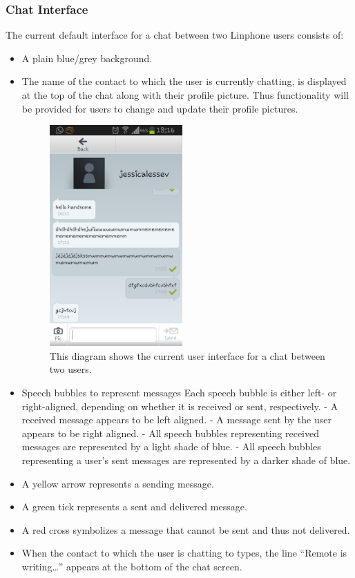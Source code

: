 \documentclass[11pt]{article}
\begin{document}
\subsubsection{Chat Interface}
The current default interface for a chat between two Linphone users consists of:
\begin{itemize}
\item	A plain blue/grey background.
\item	The name of the contact to which the user is currently chatting, is displayed at the top of the chat along with their profile picture.
\subitem Thus functionality will be provided for users to change and update their profile pictures.
\begin{figure}[H]
\centering
\includegraphics[width=2in]{./images/screen.png}
\caption[Sample Chat Screen]{This diagram shows the current user interface for a chat between two users.}
\label{cd-chat-interface}
\end{figure}
\item	Speech bubbles to represent messages
\subitem	Each speech bubble is either left- or right-aligned, depending on whether it is received or sent, respectively.
\subitem	- A received message appears to be left aligned.
\subitem	- A message sent by the user appears to be right aligned.
\subitem	- All speech bubbles representing received messages are represented by a light shade of blue.
\subitem	- All speech bubbles representing a user's sent messages are represented by a darker shade of blue.
\item	A yellow arrow represents a sending message.
\item	A green tick represents a sent and delivered message.
\item	A red cross symbolizes a message that cannot be sent and thus not delivered.
\item	When the contact to which the user is chatting to types, the line “Remote is writing…” appears at the bottom of the chat screen.

\end{itemize}
\end{document}
